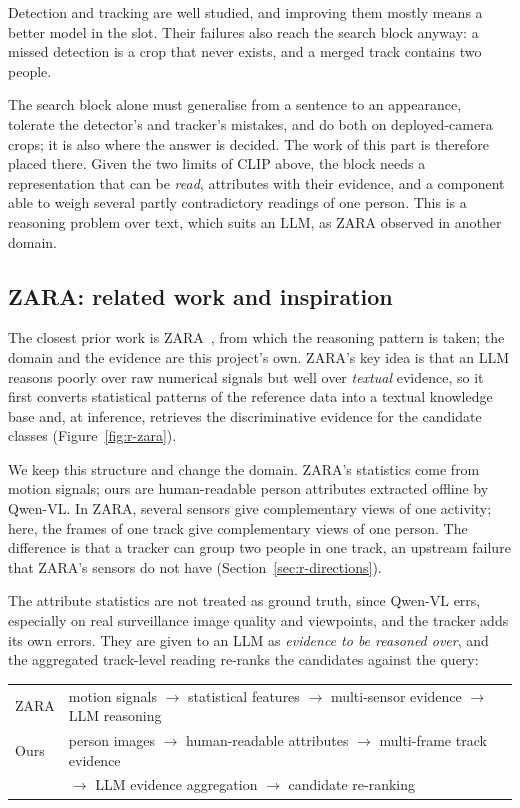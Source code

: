 Detection and tracking are well studied, and improving them mostly means a better
model in the slot. Their failures also reach the search block anyway: a missed
detection is a crop that never exists, and a merged track contains two people.

The search block alone must generalise from a sentence to an appearance, tolerate
the detector's and tracker's mistakes, and do both on deployed-camera crops; it is
also where the answer is decided. The work of this part is therefore placed there.
Given the two limits of CLIP above, the block needs a representation that can be
\emph{read}, attributes with their evidence, and a component able to weigh several
partly contradictory readings of one person. This is a reasoning problem over text,
which suits an LLM, as ZARA observed in another domain.

\subsection{ZARA: related work and inspiration}
\label{sec:r-zara}
The closest prior work is ZARA~\cite{li2025zara}, from which the reasoning pattern
is taken; the domain and the evidence are this project's own. ZARA's key idea is
that an LLM reasons poorly over raw numerical signals but well over \emph{textual}
evidence, so it first converts statistical patterns of the reference data into a
textual knowledge base and, at inference, retrieves the discriminative evidence for
the candidate classes (Figure~\ref{fig:r-zara}).

We keep this structure and change the domain. ZARA's statistics come from motion
signals; ours are human-readable person attributes extracted offline by Qwen-VL.
In ZARA, several sensors give complementary views of one activity; here, the
frames of one track give complementary views of one person. The difference is that
a tracker can group two people in one track, an upstream failure that ZARA's
sensors do not have (Section~\ref{sec:r-directions}).

The attribute statistics are not treated as ground truth, since Qwen-VL errs,
especially on real surveillance image quality and viewpoints, and the tracker adds
its own errors. They are given to an LLM as \emph{evidence to be reasoned over},
and the aggregated track-level reading re-ranks the candidates against the query:

\begin{center}
\small
\begin{tabular}{@{}ll@{}}
\toprule
ZARA & motion signals $\rightarrow$ statistical features $\rightarrow$
       multi-sensor evidence $\rightarrow$ LLM reasoning\\
Ours & person images $\rightarrow$ human-readable attributes $\rightarrow$
       multi-frame track evidence\\
     & \quad $\rightarrow$ LLM evidence aggregation $\rightarrow$ candidate
       re-ranking\\
\bottomrule
\end{tabular}
\end{center}

